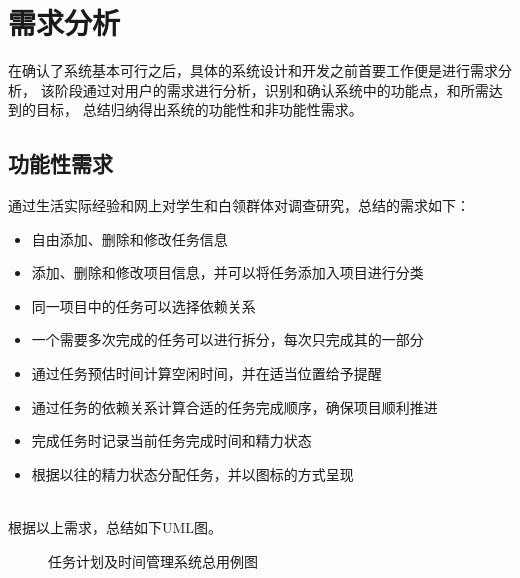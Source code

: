 \chapter{需求分析}
在确认了系统基本可行之后，具体的系统设计和开发之前首要工作便是进行需求分析，
该阶段通过对用户的需求进行分析，识别和确认系统中的功能点，和所需达到的目标，
总结归纳得出系统的功能性和非功能性需求。
\section{功能性需求}
通过生活实际经验和网上对学生和白领群体对调查研究，总结的需求如下：
\begin{itemize}
	\item 自由添加、删除和修改任务信息
	\item 添加、删除和修改项目信息，并可以将任务添加入项目进行分类
	\item 同一项目中的任务可以选择依赖关系
	\item 一个需要多次完成的任务可以进行拆分，每次只完成其的一部分
	\item 通过任务预估时间计算空闲时间，并在适当位置给予提醒
	\item 通过任务的依赖关系计算合适的任务完成顺序，确保项目顺利推进
	\item 完成任务时记录当前任务完成时间和精力状态
	\item 根据以往的精力状态分配任务，并以图标的方式呈现
\end{itemize}

~\\
根据以上需求，总结如下UML图。
~\\

\begin{figure}[!htp]
	\centering
	\caption{任务计划及时间管理系统总用例图}
    \label{fig:use_case}
\end{figure}

